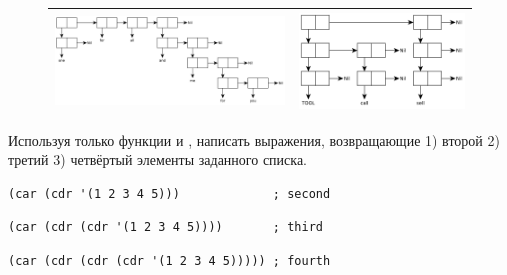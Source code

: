 \documentclass[a4paper]{report}
\begin{document}
\begin{figure}[!h]
\begin{tabular}{|l|l|}
		\includegraphics[scale=0.475]{inc/img/task0103.pdf} & \includegraphics[scale=0.475]{inc/img/task0106.pdf} \\\hline
	\end{tabular}
\end{figure}

\begin{task}
	Используя только функции  и , написать выражения, возвращающие 1) второй 2) третий 3) четвёртый элементы заданного списка.
\end{task}

\begin{AutoMultiColEnumerate}
	\item
\begin{lstlisting}[style=lispinline]
(car (cdr '(1 2 3 4 5)))             ; second
\end{lstlisting}

	\item
\begin{lstlisting}[style=lispinline]
(car (cdr (cdr '(1 2 3 4 5))))       ; third
\end{lstlisting}

	\item
\begin{lstlisting}[style=lispinline]
(car (cdr (cdr (cdr '(1 2 3 4 5))))) ; fourth
\end{lstlisting}
\end{AutoMultiColEnumerate}
\end{document}
